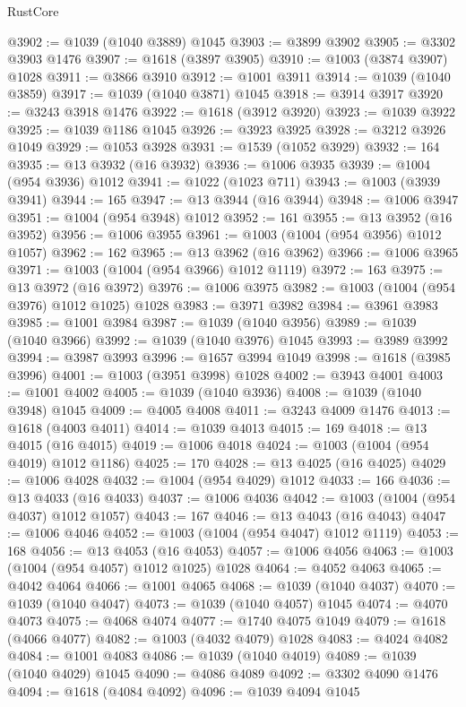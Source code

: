 \begin{lexlean}{RustCore}
\begin{coremodule}
@3902 := @1039 (@1040 @3889) @1045
@3903 := @3899 @3902
@3905 := @3302 @3903 @1476
@3907 := @1618 (@3897 @3905)
@3910 := @1003 (@3874 @3907) @1028
@3911 := @3866 @3910
@3912 := @1001 @3911
@3914 := @1039 (@1040 @3859)
@3917 := @1039 (@1040 @3871) @1045
@3918 := @3914 @3917
@3920 := @3243 @3918 @1476
@3922 := @1618 (@3912 @3920)
@3923 := @1039 @3922
@3925 := @1039 @1186 @1045
@3926 := @3923 @3925
@3928 := @3212 @3926 @1049
@3929 := @1053 @3928
@3931 := @1539 (@1052 @3929)
@3932 := 164
@3935 := @13 @3932 (@16 @3932)
@3936 := @1006 @3935
@3939 := @1004 (@954 @3936) @1012
@3941 := @1022 (@1023 @711)
@3943 := @1003 (@3939 @3941)
@3944 := 165
@3947 := @13 @3944 (@16 @3944)
@3948 := @1006 @3947
@3951 := @1004 (@954 @3948) @1012
@3952 := 161
@3955 := @13 @3952 (@16 @3952)
@3956 := @1006 @3955
@3961 := @1003 (@1004 (@954 @3956) @1012 @1057)
@3962 := 162
@3965 := @13 @3962 (@16 @3962)
@3966 := @1006 @3965
@3971 := @1003 (@1004 (@954 @3966) @1012 @1119)
@3972 := 163
@3975 := @13 @3972 (@16 @3972)
@3976 := @1006 @3975
@3982 := @1003 (@1004 (@954 @3976) @1012 @1025) @1028
@3983 := @3971 @3982
@3984 := @3961 @3983
@3985 := @1001 @3984
@3987 := @1039 (@1040 @3956)
@3989 := @1039 (@1040 @3966)
@3992 := @1039 (@1040 @3976) @1045
@3993 := @3989 @3992
@3994 := @3987 @3993
@3996 := @1657 @3994 @1049
@3998 := @1618 (@3985 @3996)
@4001 := @1003 (@3951 @3998) @1028
@4002 := @3943 @4001
@4003 := @1001 @4002
@4005 := @1039 (@1040 @3936)
@4008 := @1039 (@1040 @3948) @1045
@4009 := @4005 @4008
@4011 := @3243 @4009 @1476
@4013 := @1618 (@4003 @4011)
@4014 := @1039 @4013
@4015 := 169
@4018 := @13 @4015 (@16 @4015)
@4019 := @1006 @4018
@4024 := @1003 (@1004 (@954 @4019) @1012 @1186)
@4025 := 170
@4028 := @13 @4025 (@16 @4025)
@4029 := @1006 @4028
@4032 := @1004 (@954 @4029) @1012
@4033 := 166
@4036 := @13 @4033 (@16 @4033)
@4037 := @1006 @4036
@4042 := @1003 (@1004 (@954 @4037) @1012 @1057)
@4043 := 167
@4046 := @13 @4043 (@16 @4043)
@4047 := @1006 @4046
@4052 := @1003 (@1004 (@954 @4047) @1012 @1119)
@4053 := 168
@4056 := @13 @4053 (@16 @4053)
@4057 := @1006 @4056
@4063 := @1003 (@1004 (@954 @4057) @1012 @1025) @1028
@4064 := @4052 @4063
@4065 := @4042 @4064
@4066 := @1001 @4065
@4068 := @1039 (@1040 @4037)
@4070 := @1039 (@1040 @4047)
@4073 := @1039 (@1040 @4057) @1045
@4074 := @4070 @4073
@4075 := @4068 @4074
@4077 := @1740 @4075 @1049
@4079 := @1618 (@4066 @4077)
@4082 := @1003 (@4032 @4079) @1028
@4083 := @4024 @4082
@4084 := @1001 @4083
@4086 := @1039 (@1040 @4019)
@4089 := @1039 (@1040 @4029) @1045
@4090 := @4086 @4089
@4092 := @3302 @4090 @1476
@4094 := @1618 (@4084 @4092)
@4096 := @1039 @4094 @1045

\end{coremodule}
\end{lexlean}
